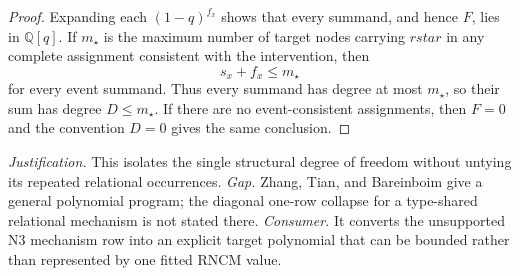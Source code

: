 \documentclass{article}
\begin{document}
\begin{proof}
Expanding each \((1-q)^{f_x}\) shows that every summand, and hence \(F\), lies in \(\mathbb Q[q]\).  If \(m_\star\) is the maximum number of target nodes carrying \(rstar\) in any complete assignment consistent with the intervention, then
\[
 s_x+f_x\leq m_\star
\]
for every event summand.  Thus every summand has degree at most \(m_\star\), so their sum has degree \(D\leq m_\star\).  If there are no event-consistent assignments, then \(F=0\) and the convention \(D=0\) gives the same conclusion.
\end{proof}
\par\smallskip\noindent \textit{Justification.} This isolates the single structural degree of freedom without untying its repeated relational occurrences. \textit{Gap.} Zhang, Tian, and Bareinboim give a general polynomial program; the diagonal one-row collapse for a type-shared relational mechanism is not stated there. \textit{Consumer.} It converts the unsupported N3 mechanism row into an explicit target polynomial that can be bounded rather than represented by one fitted RNCM value.
\end{document}
